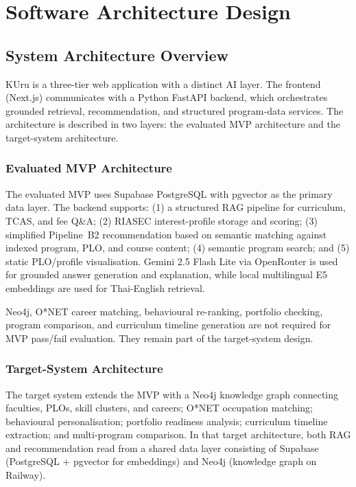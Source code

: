 \chapter{Software Architecture Design}
\label{chap:software-architecture-design}

\section{System Architecture Overview}
\label{section:architecture-overview}

KUru is a three-tier web application with a distinct AI layer. The frontend (Next.js) communicates with a Python FastAPI backend, which orchestrates grounded retrieval, recommendation, and structured program-data services. The architecture is described in two layers: the evaluated MVP architecture and the target-system architecture.

\subsection{Evaluated MVP Architecture}
\label{subsection:mvp-architecture}

The evaluated MVP uses Supabase PostgreSQL with pgvector as the primary data layer. The backend supports: (1) a structured RAG pipeline for curriculum, TCAS, and fee Q\&A; (2) RIASEC interest-profile storage and scoring; (3) simplified Pipeline~B2 recommendation based on semantic matching against indexed program, PLO, and course content; (4) semantic program search; and (5) static PLO/profile visualisation. Gemini 2.5 Flash Lite via OpenRouter is used for grounded answer generation and explanation, while local multilingual E5 embeddings are used for Thai-English retrieval.

Neo4j, O*NET career matching, behavioural re-ranking, portfolio checking, program comparison, and curriculum timeline generation are not required for MVP pass/fail evaluation. They remain part of the target-system design.

\subsection{Target-System Architecture}
\label{subsection:target-architecture}

The target system extends the MVP with a Neo4j knowledge graph connecting faculties, PLOs, skill clusters, and careers; O*NET occupation matching; behavioural personalisation; portfolio readiness analysis; curriculum timeline extraction; and multi-program comparison. In that target architecture, both RAG and recommendation read from a shared data layer consisting of Supabase (PostgreSQL + pgvector for embeddings) and Neo4j (knowledge graph on Railway).

